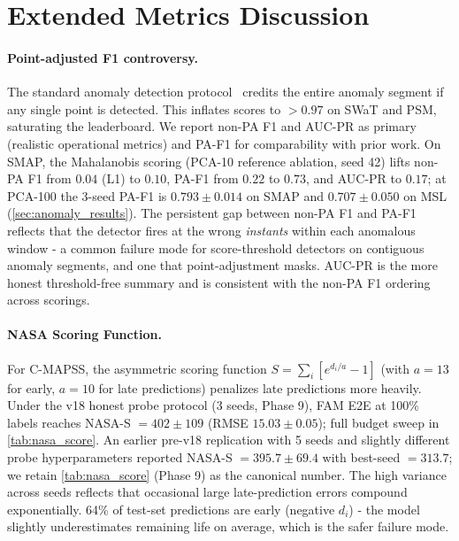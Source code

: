 \documentclass{article}
\begin{document}



\newpage
\appendix

\section{Extended Metrics Discussion}
\label{app:metrics}

\paragraph{Point-adjusted F1 controversy.}
The standard anomaly detection protocol~\citep{schmidl2022tsadeval} credits the entire anomaly segment if any single point is detected. This inflates scores to $>0.97$ on SWaT and PSM, saturating the leaderboard. We report non-PA F1 and AUC-PR as primary (realistic operational metrics) and PA-F1 for comparability with prior work. On SMAP, the Mahalanobis scoring (PCA-10 reference ablation, seed 42) lifts non-PA F1 from $0.04$ (L1) to $0.10$, PA-F1 from $0.22$ to $0.73$, and AUC-PR to $0.17$; at PCA-100 the 3-seed PA-F1 is $0.793 \pm 0.014$ on SMAP and $0.707 \pm 0.050$ on MSL (\cref{sec:anomaly_results}). The persistent gap between non-PA F1 and PA-F1 reflects that the detector fires at the wrong \emph{instants} within each anomalous window - a common failure mode for score-threshold detectors on contiguous anomaly segments, and one that point-adjustment masks. AUC-PR is the more honest threshold-free summary and is consistent with the non-PA F1 ordering across scorings.

\paragraph{NASA Scoring Function.}
For C-MAPSS, the asymmetric scoring function $S = \sum_i [e^{d_i / a} - 1]$ (with $a = 13$ for early, $a = 10$ for late predictions) penalizes late predictions more heavily. Under the v18 honest probe protocol (3 seeds, Phase 9), FAM E2E at 100\% labels reaches NASA-S $= 402 \pm 109$ (RMSE $15.03 \pm 0.05$); full budget sweep in \cref{tab:nasa_score}. An earlier pre-v18 replication with 5 seeds and slightly different probe hyperparameters reported NASA-S $= 395.7 \pm 69.4$ with best-seed $= 313.7$; we retain \cref{tab:nasa_score} (Phase 9) as the canonical number. The high variance across seeds reflects that occasional large late-prediction errors compound exponentially. 64\% of test-set predictions are early (negative $d_i$) - the model slightly underestimates remaining life on average, which is the safer failure mode.
\end{document}

